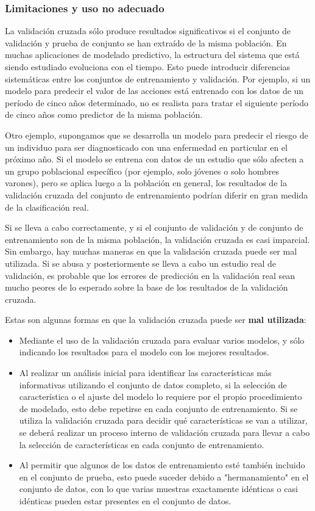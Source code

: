 \documentclass[10pt,a4paper]{article}
\begin{document}
\subsubsection{Limitaciones y uso no adecuado}
La validación cruzada sólo produce resultados significativos si el conjunto de validación y prueba de conjunto se han extraído de la misma población. En muchas aplicaciones de modelado predictivo, la estructura del sistema que está siendo estudiado evoluciona con el tiempo. Esto puede introducir diferencias sistemáticas entre los conjuntos de entrenamiento y validación. Por ejemplo, si un modelo para predecir el valor de las acciones está entrenado con los datos de un período de cinco años determinado, no es realista para tratar el siguiente período de cinco años como predictor de la misma población.

Otro ejemplo, supongamos que se desarrolla un modelo para predecir el riesgo de un individuo para ser diagnosticado con una enfermedad en particular en el próximo año. Si el modelo se entrena con datos de un estudio que sólo afecten a un grupo poblacional específico (por ejemplo, solo jóvenes o solo hombres varones), pero se aplica luego a la población en general, los resultados de la validación cruzada del conjunto de entrenamiento podrían diferir en gran medida de la clasificación real.

Si se lleva a cabo correctamente, y si el conjunto de validación y de conjunto de entrenamiento son de la misma población, la validación cruzada es casi imparcial. Sin embargo, hay muchas maneras en que la validación cruzada puede ser mal utilizada. Si se abusa y posteriormente se lleva a cabo un estudio real de validación, es probable que los errores de predicción en la validación real sean mucho peores de lo esperado sobre la base de los resultados de la validación cruzada.

Estas son algunas formas en que la validación cruzada puede ser \textbf{mal utilizada}:
\begin{itemize}
\item Mediante el uso de la validación cruzada para evaluar varios modelos, y sólo indicando los resultados para el modelo con los mejores resultados.
\item Al realizar un análisis inicial para identificar las características más informativas utilizando el conjunto de datos completo, si la selección de característica o el ajuste del modelo lo requiere por el propio procedimiento de modelado, esto debe repetirse en cada conjunto de entrenamiento. Si se utiliza la validación cruzada para decidir qué características se van a utilizar, se deberá realizar un proceso interno de validación cruzada para llevar a cabo la selección de características en cada conjunto de entrenamiento.
\item Al permitir que algunos de los datos de entrenamiento esté también incluido en el conjunto de prueba, esto puede suceder debido a "hermanamiento" en el conjunto de datos, con lo que varias muestras exactamente idénticas o casi idénticas pueden estar presentes en el conjunto de datos.
\end{itemize}
\end{document}
